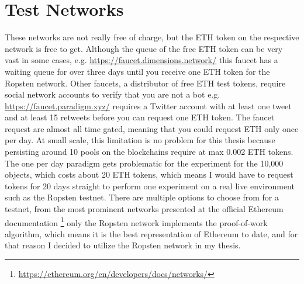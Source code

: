 \section{Test Networks}\label{sec:test-nets}
These networks are not really free of charge, but the ETH token on the respective network is free to get. Although the queue of the free ETH token can be very vast in some cases, e.g. \url{https://faucet.dimensions.network/} this faucet has a waiting queue for over three days until you receive one ETH token for the Ropsten network. Other faucets, a distributor of free ETH test tokens, require social network accounts to verify that you are not a bot e.g. \url{https://faucet.paradigm.xyz/} requires a Twitter account with at least one tweet and at least 15 retweets before you can request one ETH token. The faucet request are almost all time gated, meaning that you could request ETH only once per day. At small scale, this limitation is no problem for this thesis because persisting around 10 pools on the blockchains require at max 0.002 ETH tokens. The one per day paradigm gets problematic for the experiment for the 10,000 objects, which costs about 20 ETH tokens, which means I would have to request tokens for 20 days straight to perform one experiment on a real live environment such as the Ropsten testnet. 
There are multiple options to choose from for a testnet, from the most prominent networks presented at the official Ethereum documentation \footnote{\url{https://ethereum.org/en/developers/docs/networks/}} only the Ropsten network implements the proof-of-work algorithm, which means it is the best representation of Ethereum to date, and for that reason I decided to utilize the Ropsten network in my thesis.
